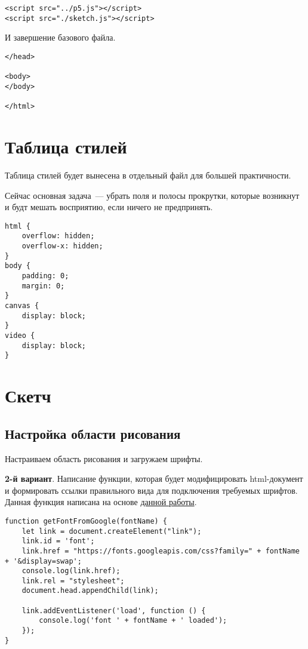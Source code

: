 \documentclass[11pt]{scrartcl}
\begin{document}
\begin{verbatim}
<script src="../p5.js"></script>
<script src="./sketch.js"></script>
\end{verbatim}

И завершение базового файла.

\begin{verbatim}
</head>

<body>
</body>

</html>
\end{verbatim}

\section{Таблица стилей}
\label{sec:orga35528d}

Таблица стилей будет вынесена в отдельный файл для большей практичности.

Сейчас основная задача — убрать поля и полосы прокрутки, которые возникнут и будт мешать восприятию, если ничего не предпринять.

\begin{verbatim}
html {
    overflow: hidden;
    overflow-x: hidden;
}
body {
    padding: 0;
    margin: 0;
}
canvas {
    display: block;
}
video {
    display: block;
}
\end{verbatim}

\section{Скетч}
\label{sec:org419c7b8}

\subsection{Настройка области рисования}
\label{sec:org2dd9382}

Настраиваем область рисования и загружаем шрифты.

\label{org7059c9f} \textbf{2-й вариант}. Написание функции, которая будет модифицировать html-документ и формировать ссылки правильного вида для подключения требуемых шрифтов. Данная функция написана на основе \href{https://editor.p5js.org/Roxanne/sketches/r1MCtfFp7}{данной работы}.

\begin{verbatim}
function getFontFromGoogle(fontName) {
    let link = document.createElement("link");
    link.id = 'font';
    link.href = "https://fonts.googleapis.com/css?family=" + fontName + '&display=swap';
    console.log(link.href);
    link.rel = "stylesheet";
    document.head.appendChild(link);

    link.addEventListener('load', function () {
        console.log('font ' + fontName + ' loaded');
    });
}
\end{verbatim}
\end{document}
